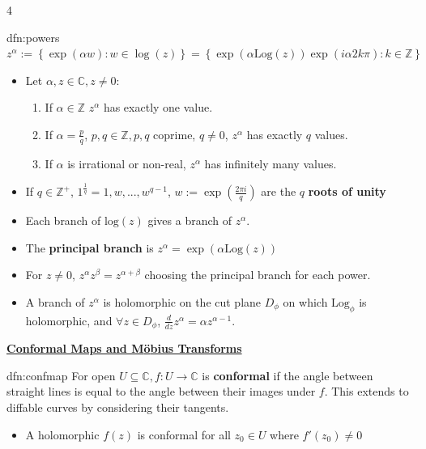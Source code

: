 \documentclass[landscape, 8pt]{extarticle}
\begin{document}
\begin{multicols*}{4}
		
		\begin{dfn}{dfn:powers}{ }
			$z^\alpha := \left\{\exp(\alpha w) : w \in \log(z)\right\} = \left\{\exp(\alpha\text{Log}(z)) \exp(i \alpha 2 k \pi): k \in \mathbb{Z}\right\}$
			\begin{itemize}
				\item Let $\alpha, z \in \mathbb{C}, z \ne 0$:
					\begin{enumerate}[label = (\roman*)]
						\item If $\alpha \in \mathbb{Z}$ $z^\alpha$ has exactly one value.
						\item If $\alpha = \frac{p}{q}$, $p, q \in \mathbb{Z}, p, q$ coprime, $q \ne 0$, $z^\alpha$ has exactly $q$ values.
						\item If $\alpha$ is irrational or non-real, $z^\alpha$ has infinitely many values.
					\end{enumerate}
				\item If $q \in \mathbb{Z}^+$, $1^{\frac{1}{q}} = 1, w, ..., w^{q-1}$, $w := \exp(\frac{2 \pi i}{q})$ are the $q$ \textbf{roots of unity}
				\item Each branch of $\text{log}(z)$ gives a branch of $z^\alpha$.
				\item The \textbf{principal branch} is $z^\alpha = \exp(\alpha \text{Log}(z))$
				\item For $z \ne 0$, $z^\alpha z^\beta = z^{\alpha + \beta}$ choosing the principal branch for each power.
				\item A branch of $z^\alpha$ is holomorphic on the cut plane $D_\phi$ on which $\text{Log}_\phi$ is holomorphic, and $ \forall z \in D_\phi$, $\frac{d}{dz}z^\alpha = \alpha z^{\alpha -1}$.
			\end{itemize}
			
			
		\end{dfn}
	
	
	
	{\footnotesize \textbf{\underline{Conformal Maps and M{\"o}bius Transforms}}}
	
	\begin{dfn}{dfn:confmap}{ }	
		For open $U \subseteq \mathbb{C}, f: U \to \mathbb{C}$ is \textbf{conformal} if the angle between straight lines is equal to the angle between their images under $f$. This extends to diffable curves by considering their tangents.
		\begin{itemize}
			\item A holomorphic $f(z)$ is conformal for all $z_0 \in U$ where $f'(z_0) \ne 0$
		\end{itemize}
		

\end{dfn}
\end{multicols*}
\end{document}
